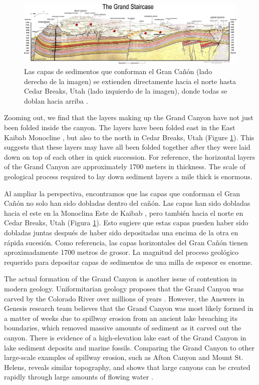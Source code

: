 \documentclass[10pt,twocolumn,letterpaper]{article}
\begin{document}
\begin{figure}
\begin{center}
\includegraphics[width=1\textwidth]{Grand_Staircase-big.jpg}
\end{center}
   \caption{Las capas de sedimentos que conforman el Gran Cañón (lado derecho de la imagen) se extienden directamente hacia el norte hasta Cedar Breaks, Utah (lado izquierdo de la imagen), donde todas se doblan hacia arriba \cite{50}.}
\label{fig:4}
\end{figure}
Zooming out, we find that the layers making up the Grand Canyon have not just been folded inside the canyon. The layers have been folded east in the East Kaibab Monocline \cite{46}, but also to the north in Cedar Breaks, Utah (Figure \ref{fig:4}). This suggests that these layers may have all been folded together after they were laid down on top of each other in quick succession. For reference, the horizontal layers of the Grand Canyon are approximately 1700 meters in thickness. The scale of geological process required to lay down sediment layers a mile thick is enormous.

Al ampliar la perspectiva, encontramos que las capas que conforman el Gran Cañón no solo han sido dobladas dentro del cañón. Las capas han sido dobladas hacia el este en la Monoclina Este de Kaibab \cite{46}, pero también hacia el norte en Cedar Breaks, Utah (Figura \ref{fig:4}). Esto sugiere que estas capas pueden haber sido dobladas juntas después de haber sido depositadas una encima de la otra en rápida sucesión. Como referencia, las capas horizontales del Gran Cañón tienen aproximadamente 1700 metros de grosor. La magnitud del proceso geológico requerido para depositar capas de sedimentos de una milla de espesor es enorme.

The actual formation of the Grand Canyon is another issue of contention in modern geology. Uniformitarian geology proposes that the Grand Canyon was carved by the Colorado River over millions of years \cite{47}. However, the Answers in Genesis research team believes that the Grand Canyon was most likely formed in a matter of weeks due to spillway erosion from an ancient lake breaching its boundaries, which removed massive amounts of sediment as it carved out the canyon. There is evidence of a high-elevation lake east of the Grand Canyon in lake sediment deposits and marine fossils. Comparing the Grand Canyon to other large-scale examples of spillway erosion, such as Afton Canyon and Mount St. Helens, reveals similar topography, and shows that large canyons can be created rapidly through large amounts of flowing water \cite{48}.
\end{document}
